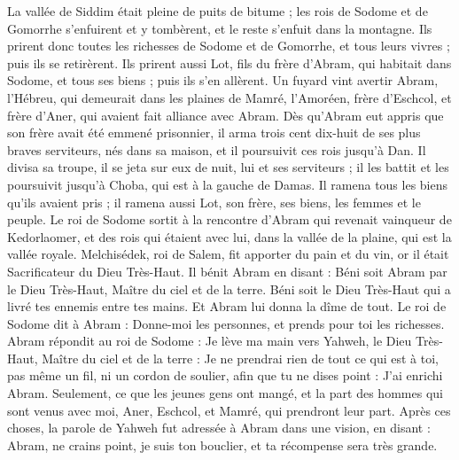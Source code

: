 \begin{multicols}{2}
La vallée de Siddim était pleine de puits de bitume ; les rois de Sodome et de Gomorrhe s'enfuirent et y tombèrent, et le reste s'enfuit dans la montagne.
Ils prirent donc toutes les richesses de Sodome et de Gomorrhe, et tous leurs vivres ; puis ils se retirèrent.
Ils prirent aussi Lot, fils du frère d'Abram, qui habitait dans Sodome, et tous ses biens ; puis ils s'en allèrent.
Un fuyard vint avertir Abram, l’Hébreu, qui demeurait dans les plaines de Mamré, l’Amoréen, frère d'Eschcol, et frère d’Aner, qui avaient fait alliance avec Abram.
Dès qu’Abram eut appris que son frère avait été emmené prisonnier, il arma trois cent dix-huit de ses plus braves serviteurs, nés dans sa maison, et il poursuivit ces rois jusqu'à Dan.
Il divisa sa troupe, il se jeta sur eux de nuit, lui et ses serviteurs ; il les battit et les poursuivit jusqu'à Choba, qui est à la gauche de Damas.
Il ramena tous les biens qu'ils avaient pris ; il ramena aussi Lot, son frère, ses biens, les femmes et le peuple.
Le roi de Sodome sortit à la rencontre d’Abram qui revenait vainqueur de Kedorlaomer, et des rois qui étaient avec lui, dans la vallée de la plaine, qui est la vallée royale.
Melchisédek, roi de Salem, fit apporter du pain et du vin, or il était Sacrificateur du Dieu Très-Haut.
Il bénit Abram en disant : Béni soit Abram par le Dieu Très-Haut, Maître du ciel et de la terre.
Béni soit le Dieu Très-Haut qui a livré tes ennemis entre tes mains. Et Abram lui donna la dîme de tout.
Le roi de Sodome dit à Abram : Donne-moi les personnes, et prends pour toi les richesses.
Abram répondit au roi de Sodome : Je lève ma main vers Yahweh, le Dieu Très-Haut, Maître du ciel et de la terre :
Je ne prendrai rien de tout ce qui est à toi, pas même un fil, ni un cordon de soulier, afin que tu ne dises point : J'ai enrichi Abram.
Seulement, ce que les jeunes gens ont mangé, et la part des hommes qui sont venus avec moi, Aner, Eschcol, et Mamré, qui prendront leur part.
\VerseOne{}Après ces choses, la parole de Yahweh fut adressée à Abram dans une vision, en disant : Abram, ne crains point, je suis ton bouclier, et ta récompense sera très grande.

\end{multicols}
